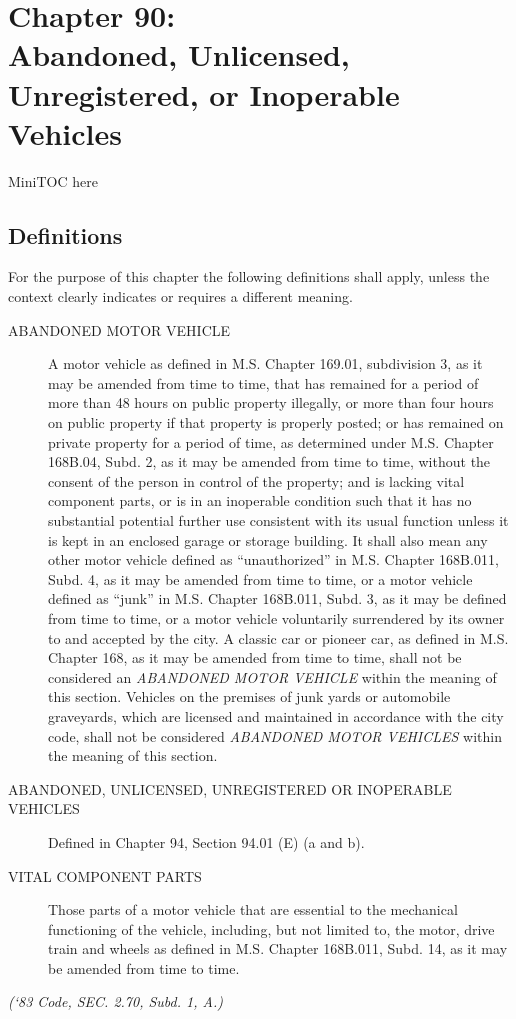 \documentclass[code.tex]{subfiles}
\begin{document}
\chapter*{Chapter 90: \\
	Abandoned, Unlicensed, Unregistered, or Inoperable Vehicles}

MiniTOC here
\pagebreak

\section{Definitions}
For the purpose of this chapter the following definitions shall apply, unless the context clearly indicates or requires a different meaning.
\begin{description}
\item[ABANDONED MOTOR VEHICLE] A motor vehicle as defined in M.S. Chapter 169.01, subdivision 3, as it may be amended from time to time, that has remained for a period of more than 48 hours on public property illegally, or more than four hours on public property if that property is properly posted; or has remained on private property for a period of time, as determined under M.S. Chapter 168B.04, Subd. 2, as it may be amended from time to time, without the consent of the person in control of the property; and is lacking vital component parts, or is in an inoperable condition such that it has no substantial potential further use consistent with its usual function unless it is kept in an enclosed garage or storage building.  It shall also mean any other motor vehicle defined as “unauthorized” in M.S. Chapter 168B.011, Subd. 4, as it may be amended from time to time, or a motor vehicle defined as “junk” in M.S. Chapter 168B.011, Subd. 3, as it may be defined from time to time, or a motor vehicle voluntarily surrendered by its owner to and accepted by the city.  A classic car or pioneer car, as defined in M.S. Chapter 168, as it may be amended from time to time, shall not be considered an \emph{ABANDONED MOTOR VEHICLE} within the meaning of this section.  Vehicles on the premises of junk yards or automobile graveyards, which are licensed and maintained in accordance with the city code, shall not be considered \emph{ABANDONED MOTOR VEHICLES} within the meaning of this section.
\item[ABANDONED, UNLICENSED, UNREGISTERED OR INOPERABLE VEHICLES] Defined in Chapter 94, Section 94.01 (E) (a and b).
\item[VITAL COMPONENT PARTS] Those parts of a motor vehicle that are essential to the mechanical functioning of the vehicle, including, but not limited to, the motor, drive train and wheels as defined in M.S. Chapter 168B.011, Subd. 14, as it may be amended from time to time.
\end{description}
\emph{(‘83 Code, SEC. 2.70, Subd. 1, A.)}
\end{document}
